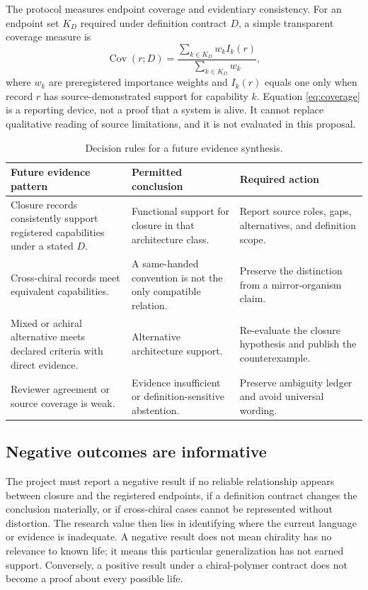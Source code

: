 \documentclass[conference]{IEEEtran}
\begin{document}
The protocol measures endpoint coverage and evidentiary consistency. For an endpoint set $K_D$ required under definition contract $D$, a simple transparent coverage measure is
\begin{equation}
\operatorname{Cov}(r;D)=\frac{\sum_{k\in K_D} w_k I_k(r)}{\sum_{k\in K_D} w_k},
\label{eq:coverage}
\end{equation}
where $w_k$ are preregistered importance weights and $I_k(r)$ equals one only when record $r$ has source-demonstrated support for capability $k$. Equation \eqref{eq:coverage} is a reporting device, not a proof that a system is alive. It cannot replace qualitative reading of source limitations, and it is not evaluated in this proposal.

\begin{table}[!t]
\caption{Decision rules for a future evidence synthesis.}
\label{tab:decisions}
\centering
\renewcommand{\arraystretch}{1.15}
\begin{tabular}{|P{0.27\columnwidth}|P{0.26\columnwidth}|P{0.29\columnwidth}|}
\hline
\textbf{Future evidence pattern} & \textbf{Permitted conclusion} & \textbf{Required action} \\
\hline
Closure records consistently support registered capabilities under a stated $D$. & Functional support for closure in that architecture class. & Report source roles, gaps, alternatives, and definition scope. \\
\hline
Cross-chiral records meet equivalent capabilities. & A same-handed convention is not the only compatible relation. & Preserve the distinction from a mirror-organism claim. \\
\hline
Mixed or achiral alternative meets declared criteria with direct evidence. & Alternative architecture support. & Re-evaluate the closure hypothesis and publish the counterexample. \\
\hline
Reviewer agreement or source coverage is weak. & Evidence insufficient or definition-sensitive abstention. & Preserve ambiguity ledger and avoid universal wording. \\
\hline
\end{tabular}
\end{table}

\subsection{Negative outcomes are informative}

The project must report a negative result if no reliable relationship appears between closure and the registered endpoints, if a definition contract changes the conclusion materially, or if cross-chiral cases cannot be represented without distortion. The research value then lies in identifying where the current language or evidence is inadequate. A negative result does not mean chirality has no relevance to known life; it means this particular generalization has not earned support. Conversely, a positive result under a chiral-polymer contract does not become a proof about every possible life.
\end{document}
